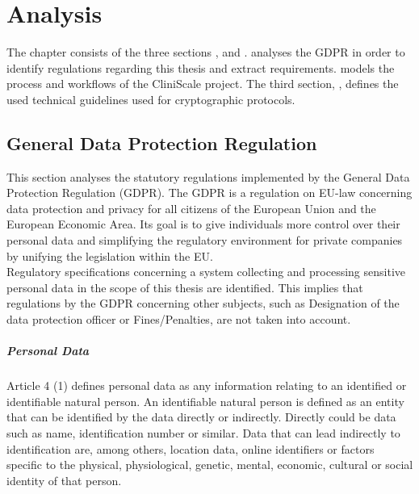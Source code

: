 \chapter{Analysis}
\label{chapterreqass}
The chapter \textit{} consists of the three sections \textit{}, \textit{} and \textit{}. \textit{} analyses the GDPR in order to identify regulations regarding this thesis and extract requirements. \textit{} models the process and workflows of the CliniScale project. The third section, \textit{}, defines the used technical guidelines used for cryptographic protocols.

\section{General Data Protection Regulation}
\label{gdpr}



This section analyses the statutory regulations implemented by the General Data Protection Regulation (GDPR).
The GDPR is a regulation on EU-law concerning data protection and privacy for all citizens of the European Union and the European Economic Area. Its goal is to give individuals more control over their personal data and simplifying the regulatory environment for private companies by unifying the legislation within the EU.
\\

Regulatory specifications concerning a system collecting and processing sensitive personal data in the scope of this thesis are identified.
This implies that regulations by the GDPR concerning other subjects, such as Designation of the data protection officer\cite{GDPR37} or Fines/Penalties\cite{GDPR84}, are not taken into account.
\\
\paragraph{Personal Data} Article 4 (1) defines personal data as any information relating to an identified or identifiable natural person. An identifiable natural person is defined as an entity that can be identified by the data directly or indirectly. Directly could be data such as name, identification number or similar. Data that can lead indirectly to identification are, among others, location data, online identifiers or factors specific to the physical, physiological, genetic, mental, economic, cultural or social identity of that person.\cite{GDPR4}

